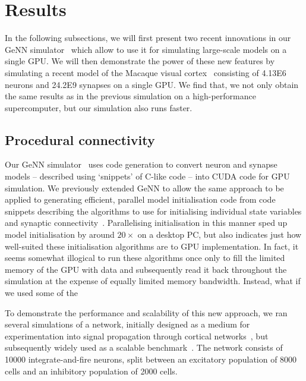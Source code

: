 \documentclass[9pt,twocolumn,twoside,lineno]{pnas-new}
\begin{document}
\section*{Results}
In the following subsections, we will first present two recent innovations in our GeNN simulator~\citep{Yavuz2016} which allow to use it for simulating large-scale models on a single GPU.
We will then demonstrate the power of these new features by simulating a recent model of the Macaque visual cortex~\citep{Schmidt2018} consisting of \num{4.13E6} neurons and \num{24.2E9} synapses on a single GPU.
We find that, we not only obtain the same results as in the previous simulation on a high-performance supercomputer, but our simulation also runs faster.

\subsection*{Procedural connectivity}
Our GeNN simulator~\citep{Yavuz2016} uses code generation to convert neuron and synapse models -- described using `snippets' of C-like code -- into CUDA code for GPU simulation.
We previously extended GeNN to allow the same approach to be applied to generating efficient, parallel model initialisation code from code snippets describing the algorithms to use for initialising individual state variables and synaptic connectivity~\citep{Knight2018}.
Parallelising initialisation in this manner sped up model initialisation by around $20\times$ on a desktop PC, but also indicates just how well-suited these initialisation algorithms are to GPU implementation.
In fact, it seems somewhat illogical to run these algorithms once only to fill the limited memory of the GPU with data and subsequently read it back throughout the simulation at the expense of equally limited memory bandwidth.
Instead, what if we used some of the 

To demonstrate the performance and scalability of this new approach, we ran several simulations of a network, initially designed as a medium for experimentation into signal propagation through cortical networks~\citep{Vogels2005}, but subsequently  widely used as a scalable benchmark~\citep{Brette2007}.
The network consists of \num{10000} integrate-and-fire neurons, split between an excitatory population of \num{8000} cells and an inhibitory population of \num{2000} cells.
\end{document}
